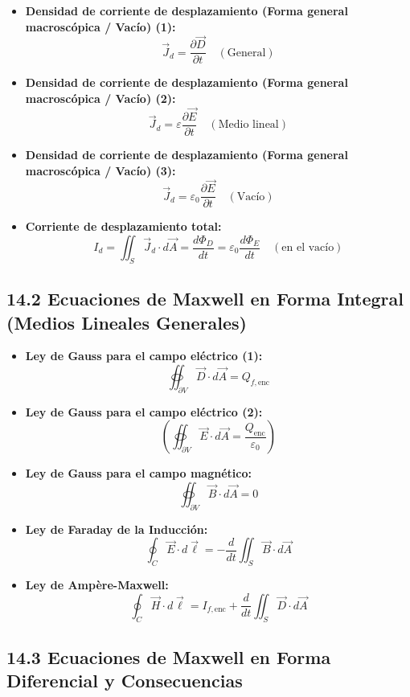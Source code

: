 \documentclass[11pt,a4paper]{article}
\begin{document}
\begin{itemize}
  \item \textbf{Densidad de corriente de desplazamiento (Forma general macroscópica / Vacío) (1):}
  \[
    \vec{J}_d = \frac{\partial \vec{D}}{\partial t} \quad (\text{General})
  \]
  \item \textbf{Densidad de corriente de desplazamiento (Forma general macroscópica / Vacío) (2):}
  \[
    \vec{J}_d = \varepsilon \frac{\partial \vec{E}}{\partial t} \quad (\text{Medio lineal})
  \]
  \item \textbf{Densidad de corriente de desplazamiento (Forma general macroscópica / Vacío) (3):}
  \[
    \vec{J}_d = \varepsilon_0 \frac{\partial \vec{E}}{\partial t} \quad (\text{Vacío})
  \]
  \item \textbf{Corriente de desplazamiento total:}
  \[
    I_d = \iint_S \vec{J}_d \cdot d\vec{A} = \frac{d\Phi_D}{dt} = \varepsilon_0 \frac{d\Phi_E}{dt} \quad (\text{en el vacío})
  \]
\end{itemize}

\subsection*{14.2 Ecuaciones de Maxwell en Forma Integral (Medios Lineales Generales)}

\begin{itemize}
  \item \textbf{Ley de Gauss para el campo eléctrico (1):}
  \[
    \oiint_{\partial V} \vec{D} \cdot d\vec{A} = Q_{f,\mathrm{enc}}
  \]
  \item \textbf{Ley de Gauss para el campo eléctrico (2):}
  \[
    \left( \oiint_{\partial V} \vec{E} \cdot d\vec{A} = \frac{Q_{\mathrm{enc}}}{\varepsilon_0} \right)
  \]
  \item \textbf{Ley de Gauss para el campo magnético:}
  \[
    \oiint_{\partial V} \vec{B} \cdot d\vec{A} = 0
  \]
  \item \textbf{Ley de Faraday de la Inducción:}
  \[
    \oint_C \vec{E} \cdot d\vec{\ell} = -\frac{d}{dt} \iint_S \vec{B} \cdot d\vec{A}
  \]
  \item \textbf{Ley de Ampère-Maxwell:}
  \[
    \oint_C \vec{H} \cdot d\vec{\ell} = I_{f,\mathrm{enc}} + \frac{d}{dt} \iint_S \vec{D} \cdot d\vec{A}
  \]
\end{itemize}

\subsection*{14.3 Ecuaciones de Maxwell en Forma Diferencial y Consecuencias}
\end{document}
